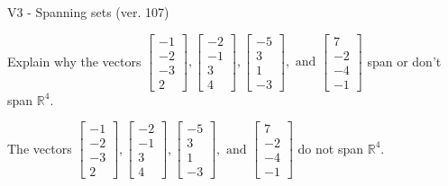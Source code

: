 \begin{exercise}
  \begin{exerciseTitle}V3 - Spanning sets (ver. 107)\end{exerciseTitle}
  \begin{exerciseStatement}
    Explain why the vectors \(\left[\begin{array}{r}
-1 \\
-2 \\
-3 \\
2
\end{array}\right] , \left[\begin{array}{r}
-2 \\
-1 \\
3 \\
4
\end{array}\right] , \left[\begin{array}{r}
-5 \\
3 \\
1 \\
-3
\end{array}\right] , \text{ and } \left[\begin{array}{r}
7 \\
-2 \\
-4 \\
-1
\end{array}\right]\) span or don't span \(\mathbb{R}^4\). 
	


  \end{exerciseStatement}
  \begin{exerciseAnswer}
   The vectors \(\left[\begin{array}{r}
-1 \\
-2 \\
-3 \\
2
\end{array}\right] , \left[\begin{array}{r}
-2 \\
-1 \\
3 \\
4
\end{array}\right] , \left[\begin{array}{r}
-5 \\
3 \\
1 \\
-3
\end{array}\right] , \text{ and } \left[\begin{array}{r}
7 \\
-2 \\
-4 \\
-1
\end{array}\right]\) 
  	 do not  
	span \(\mathbb{R}^4\).
  


  \end{exerciseAnswer}
\end{exercise}